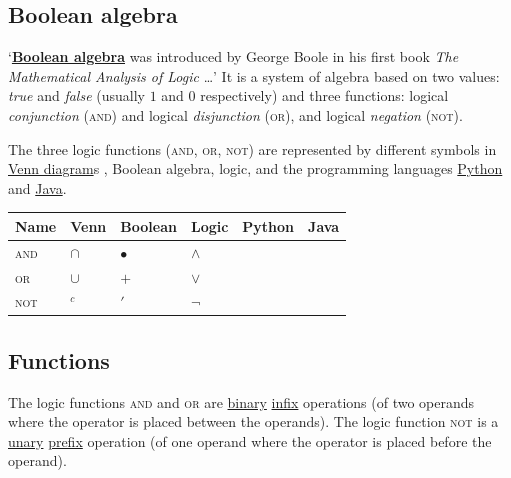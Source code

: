 \documentclass[11pt]{article}%
\begin{document}
\begin{multicols}{2}
\section{Boolean algebra}
\label{Boolean}

`\textbf{\href{https://en.wikipedia.org/wiki/Boolean_algebra}{Boolean algebra}} \parencite{wiki:boolean-algebra} was introduced by George Boole in his first book \textit{The Mathematical Analysis of Logic} \parencite{book:mathematical-analysis-of-logic}\dots' It is a system of algebra based on two values: \textit{true} and \textit{false} (usually $1$ and $0$ respectively) and three functions: logical \textit{conjunction} (\textsc{and}) and logical \textit{disjunction} (\textsc{or}), and logical \textit{negation} (\textsc{not}).

The three logic functions (\textsc{and}, \textsc{or}, \textsc{not}) are represented by different symbols in \href{https://en.wikipedia.org/wiki/Venn_diagram}{Venn diagram}s \parencite{wiki:venn-diagram}, Boolean algebra, logic, and the programming languages \href{http://python.org/}{Python} and \href{https://java.oracle.com}{Java}.

\small{\begin{tabularx}{1.0\linewidth}{@{}Y|Y|Y|Y|Y|Y@{}}
Name & Venn & Boolean & Logic & Python & Java \\\hline
\textsc{and} & $\cap$ & $\bullet$ & $\wedge$ &  & \code{\&\&} \\
\textsc{or} & $\cup$ & $+$ & $\vee$ &  & \code{||} \\
\textsc{not} & $^{c}$ & $'$ & $\neg$ &  & \code{!} \\
\end{tabularx}}


\subsection{Functions}
\label{Functions}

The logic functions \textsc{and} and \textsc{or} are \href{https://en.wikipedia.org/wiki/Binary_operation}{binary} \href{https://en.wikipedia.org/wiki/Infix_notation}{infix} operations (of two operands where the operator is placed between the operands). The logic function \textsc{not} is a \href{https://en.wikipedia.org/wiki/Unary_operation}{unary} \href{https://en.wikipedia.org/wiki/Polish_notation}{prefix} operation (of one operand where the operator is placed before the operand).


\end{multicols}
\end{document}

